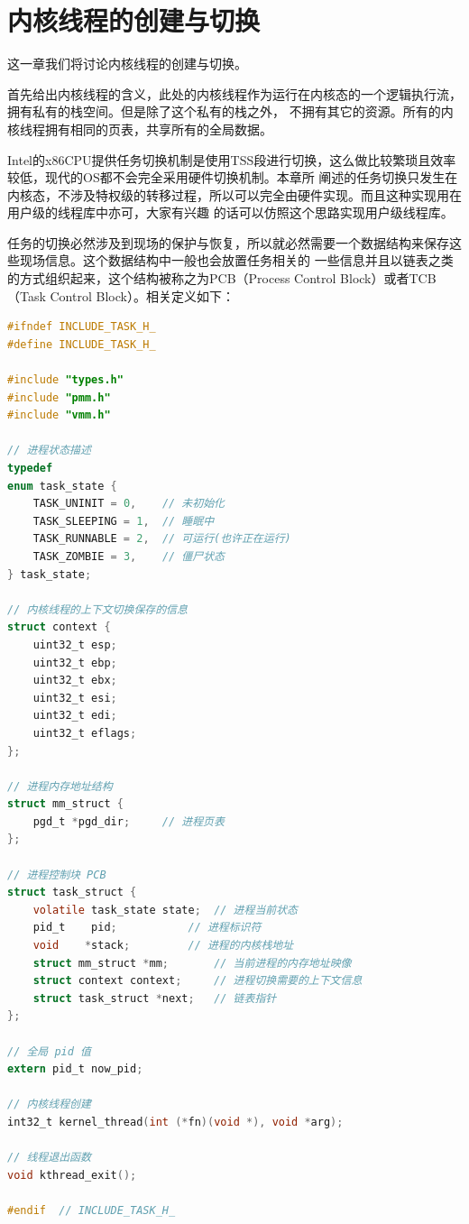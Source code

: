 
\section {内核线程的创建与切换}

\par 这一章我们将讨论内核线程的创建与切换。

\par 首先给出内核线程的含义，此处的内核线程作为运行在内核态的一个逻辑执行流，拥有私有的栈空间。但是除了这个私有的栈之外，\allowbreak
不拥有其它的资源。所有的内核线程拥有相同的页表，共享所有的全局数据。

\par Intel的x86CPU提供任务切换机制是使用TSS段进行切换，这么做比较繁琐且效率较低，现代的OS都不会完全采用硬件切换机制。本章所\allowbreak
阐述的任务切换只发生在内核态，不涉及特权级的转移过程，所以可以完全由硬件实现。而且这种实现用在用户级的线程库中亦可，大家有兴趣\allowbreak
的话可以仿照这个思路实现用户级线程库。

\par 任务的切换必然涉及到现场的保护与恢复，所以就必然需要一个数据结构来保存这些现场信息。这个数据结构中一般也会放置任务相关的\allowbreak
一些信息并且以链表之类的方式组织起来，这个结构被称之为PCB（Process Control Block）或者TCB（Task Control Block）。相关定义如下：

\begin{lstlisting}[language = C, caption = include/task.h]
#ifndef INCLUDE_TASK_H_
#define INCLUDE_TASK_H_

#include "types.h"
#include "pmm.h"
#include "vmm.h"

// 进程状态描述
typedef
enum task_state {
	TASK_UNINIT = 0, 	// 未初始化
	TASK_SLEEPING = 1, 	// 睡眠中
	TASK_RUNNABLE = 2, 	// 可运行(也许正在运行)
	TASK_ZOMBIE = 3, 	// 僵尸状态
} task_state;

// 内核线程的上下文切换保存的信息
struct context {
	uint32_t esp;
	uint32_t ebp;
	uint32_t ebx;
	uint32_t esi;
	uint32_t edi;
	uint32_t eflags;
};

// 进程内存地址结构
struct mm_struct {
	pgd_t *pgd_dir; 	// 进程页表
};

// 进程控制块 PCB 
struct task_struct {
	volatile task_state state; 	// 进程当前状态
	pid_t 	 pid; 			// 进程标识符
	void  	*stack; 		// 进程的内核栈地址
	struct mm_struct *mm; 		// 当前进程的内存地址映像
	struct context context; 	// 进程切换需要的上下文信息
	struct task_struct *next; 	// 链表指针
};

// 全局 pid 值
extern pid_t now_pid;

// 内核线程创建
int32_t kernel_thread(int (*fn)(void *), void *arg);

// 线程退出函数
void kthread_exit();

#endif 	// INCLUDE_TASK_H_
\end{lstlisting}

